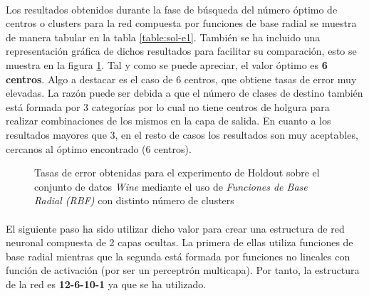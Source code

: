 \documentclass{article}
\begin{document}
		\paragraph{}
		Los resultados obtenidos durante la fase de búsqueda del número óptimo de centros o clusters para la red compuesta por funciones de base radial se muestra de manera tabular en la tabla \ref{table:sol-e1}. También se ha incluido una representación gráfica de dichos resultados para facilitar su comparación, esto se muestra en la figura \ref{plot:sol-e1}. Tal y como se puede apreciar, el valor óptimo es \textbf{6 centros}. Algo a destacar es el caso de 6 centros, que obtiene tasas de error muy elevadas. La razón puede ser debida a que el número de clases de destino también está formada por 3 categorías por lo cual no tiene centros de holgura para realizar combinaciones de los mismos en la capa de salida. En cuanto a los resultados mayores que 3, en el resto de casos los resultados son muy aceptables, cercanos al óptimo encontrado (6 centros).

		\begin{figure}
			\begin{center}
			\end{center}
			\caption{Tasas de error obtenidas para el experimento de Holdout sobre el conjunto de datos \emph{Wine} mediante el uso de \emph{Funciones de Base Radial (RBF)} con distinto número de clusters}
			\label{plot:sol-e1}
		\end{figure}

		\paragraph{}
		El siguiente paso ha sido utilizar dicho valor para crear una estructura de red neuronal compuesta de 2 capas ocultas. La primera de ellas utiliza funciones de base radial mientras que la segunda está formada por funciones no lineales con función de activación (por ser un perceptrón multicapa). Por tanto, la estructura de la red es \textbf{12-6-10-1} ya que se ha utilizado.
\end{document}
